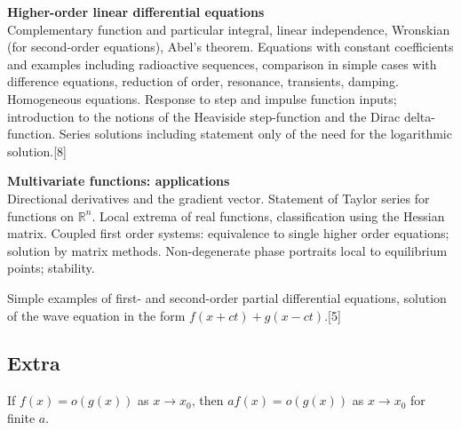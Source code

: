 {  \vspace{10pt}
  \noindent\textbf{Higher-order linear differential equations}\\
  Complementary function and particular integral, linear independence, Wronskian (for second-order equations), Abel's theorem. Equations with constant coefficients and examples including radioactive sequences, comparison in simple cases with difference equations, reduction of order, resonance, transients, damping. Homogeneous equations. Response to step and impulse function inputs; introduction to the notions of the Heaviside step-function and the Dirac delta-function. Series solutions including statement only of the need for the logarithmic solution.\hspace*{\fill}[8]

  \vspace{10pt}
  \noindent\textbf{Multivariate functions: applications}\\
  Directional derivatives and the gradient vector. Statement of Taylor series for functions on $\mathbb{R}^n$. Local extrema of real functions, classification using the Hessian matrix. Coupled first order systems: equivalence to single higher order equations; solution by matrix methods. Non-degenerate phase portraits local to equilibrium points; stability.

  \vspace{5pt}
  \noindent Simple examples of first- and second-order partial differential equations, solution of the wave equation in the form $f(x + ct) + g(x - ct)$.\hspace*{\fill}[5]}

\tableofcontents





\subsection{Extra}

If \(f(x) = o(g(x))\) as \(x \to x_0\), then \(af(x) = o(g(x))\) as \(x \to x_0\) for finite \(a\).

